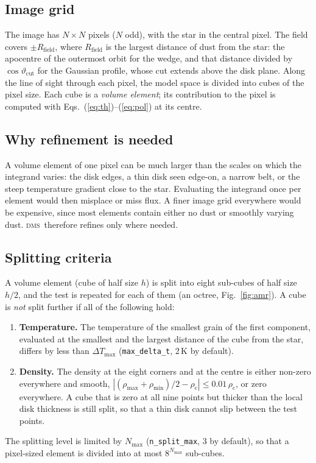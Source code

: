 \documentclass[11pt,a4paper]{article}
\newcommand{\dms}{\textsc{dms}}
\newcommand{\code}[1]{\texttt{#1}}
\begin{document}
\subsection{Image grid}

The image has $N\times N$ pixels ($N$ odd), with the star in the central pixel. The field covers
$\pm R_\mathrm{field}$, where $R_\mathrm{field}$ is the largest distance of dust from the star:
the apocentre of the outermost orbit for the wedge, and that distance divided by
$\cos\vartheta_\mathrm{cut}$ for the Gaussian profile, whose cut extends above the disk plane.
Along the line of sight through each pixel, the model space is divided into cubes of the pixel
size. Each cube is a \emph{volume element}; its contribution to the pixel is computed with
Eqs.~(\ref{eq:th})--(\ref{eq:pol}) at its centre.

\subsection{Why refinement is needed}

A volume element of one pixel can be much larger than the scales on which the integrand varies:
the disk edges, a thin disk seen edge-on, a narrow belt, or the steep temperature gradient close
to the star. Evaluating the integrand once per element would then misplace or miss flux. A finer
image grid everywhere would be expensive, since most elements contain either no dust or smoothly
varying dust. \dms\ therefore refines only where needed.

\subsection{Splitting criteria}

A volume element (cube of half size $h$) is split into eight sub-cubes of half size $h/2$, and the
test is repeated for each of them (an octree, Fig.~\ref{fig:amr}). A cube is \emph{not} split
further if all of the following hold:
\begin{enumerate}
\item \textbf{Temperature.} The temperature of the smallest grain of the first component, evaluated
      at the smallest and the largest distance of the cube from the star, differs by less than
      $\Delta T_\mathrm{max}$ (\code{max\_delta\_t}, 2\,K by default).
\item \textbf{Density.} The density at the eight corners and at the centre is either non-zero
      everywhere and smooth, $|(\rho_\mathrm{max}+\rho_\mathrm{min})/2-\rho_\mathrm{c}|\le0.01\,
      \rho_\mathrm{c}$, or zero everywhere. A cube that is zero at all nine points but thicker than
      the local disk thickness is still split, so that a thin disk cannot slip between the test
      points.
\end{enumerate}
The splitting level is limited by $N_\mathrm{max}$ (\code{n\_split\_max}, 3 by default), so that
a pixel-sized element is divided into at most $8^{N_\mathrm{max}}$ sub-cubes.
\end{document}

